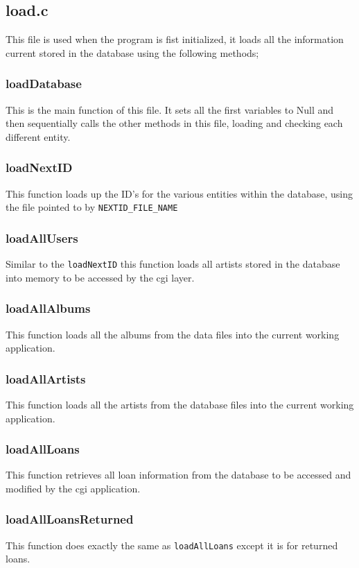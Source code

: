 \documentclass{article}
\begin{document}
\subsection{load.c}
This file is used when the program is fist initialized, it loads all the information current stored in the database using the following methods;

\subsubsection*{loadDatabase}
This is the main function of this file. It sets all the first variables to Null
and then sequentially calls the other methods in this file, loading and checking each different entity.

\subsubsection*{loadNextID}
This function loads up the ID's for the various entities within the database, using the file pointed to by \verb|NEXTID_FILE_NAME|

\subsubsection*{loadAllUsers}
Similar to the \verb|loadNextID| this function loads all artists stored in the database into memory to be accessed by the cgi layer.

\subsubsection*{loadAllAlbums}
This function loads all the albums from the data files into the current working application.

\subsubsection*{loadAllArtists}
This function loads all the artists from the database files into the current working application.

\subsubsection*{loadAllLoans}
\label{loan}
This function retrieves all loan information from the database to be accessed and modified by the cgi application.

\subsubsection*{loadAllLoansReturned}
This function does exactly the same as \verb|loadAllLoans| except it is for returned loans.
\end{document}
